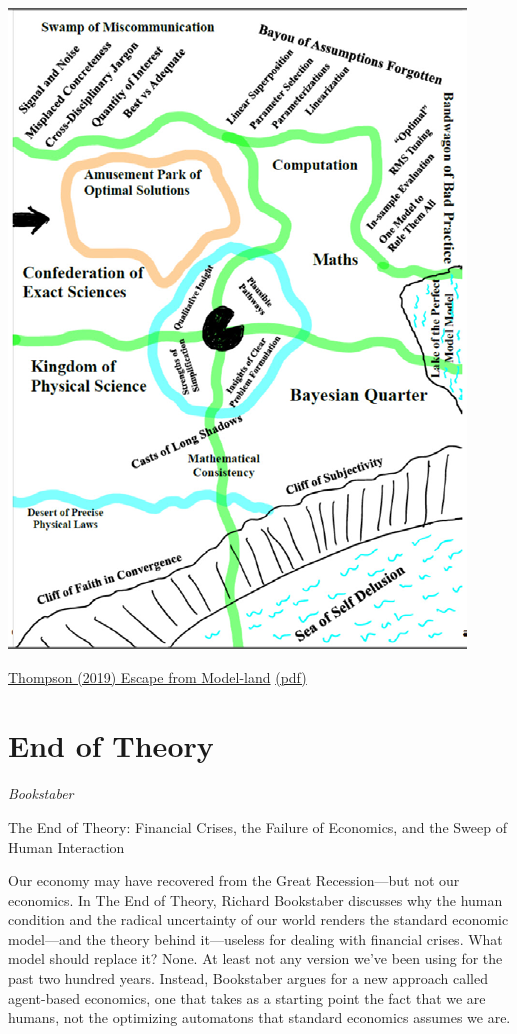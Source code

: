 \documentclass[
]{book}
\begin{document}
\includegraphics{fig/model-land.png}

\href{http://www.economics-ejournal.org/economics/journalarticles/2019-40/}{Thompson (2019) Escape from Model-land}
\href{pdf/Thompson_2019_Escape_from_Model-land.pdf}{(pdf)}

\hypertarget{end-of-theory}{%
\section{End of Theory}\label{end-of-theory}}

\emph{Bookstaber}

The End of Theory: Financial Crises, the Failure of Economics, and the Sweep of Human Interaction

Our economy may have recovered from the Great Recession---but not our economics. In The End of Theory, Richard Bookstaber discusses why the human condition and the radical uncertainty of our world renders the standard economic model---and the theory behind it---useless for dealing with financial crises. What model should replace it? None. At least not any version we've been using for the past two hundred years. Instead, Bookstaber argues for a new approach called agent-based economics, one that takes as a starting point the fact that we are humans, not the optimizing automatons that standard economics assumes we are.
\end{document}
